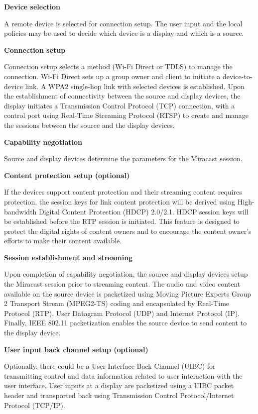 \textbf{Device selection}

A remote device is selected for connection setup. The user input and the local policies may be used to decide which device is a display and which is a source.

\textbf{Connection setup}

Connection setup selects a method (Wi-Fi Direct or TDLS) to manage the connection. Wi-Fi Direct sets up a group owner and client to initiate a device-to-device link. A WPA2 single-hop link with selected devices is established. Upon the establishment of connectivity between the source and display devices, the display initiates a Transmission Control Protocol (TCP) connection, with a control port using Real-Time Streaming Protocol (RTSP) to create and manage the sessions between the source and the display devices.

\textbf{Capability negotiation} 

Source and display devices determine the parameters for the Miracast session. 

\textbf{Content protection setup (optional)}

If the devices support content protection and their streaming content requires
protection, the session keys for link content protection will be derived using High-bandwidth Digital Content Protection (HDCP) 2.0/2.1. HDCP session keys will be established before the RTP session is initiated. This feature is designed to protect the digital rights of content owners and to encourage the content owner's efforts to make their content available.

\textbf{Session establishment and streaming}

Upon completion of capability negotiation, the source and display devices setup the Miracast session prior to streaming content. The audio and video content available on the source device is packetized 
using Moving Picture Experts Group 2 Transport Stream (MPEG2-TS) coding and
encapsulated by Real-Time Protocol (RTP), User Datagram Protocol (UDP) and Internet Protocol (IP). Finally, IEEE 802.11 packetization enables the source device to send content to the display device.

\textbf{User input back channel setup (optional)}

Optionally, there could be a User Interface Back Channel (UIBC) for transmitting
control and data information related to user interaction with the user interface. User inputs at a display are packetized using a UIBC packet header and transported back using Transmission Control Protocol/Internet Protocol (TCP/IP).

